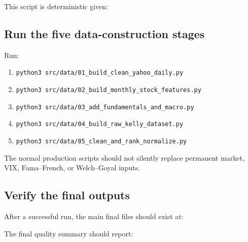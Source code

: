\documentclass[11pt,a4paper]{article}
\newcommand{\code}[1]{\texttt{#1}}
\begin{document}
This script is deterministic given:

\begin{center}
\end{center}

\subsection{Run the five data-construction stages}

Run:

\begin{enumerate}
  \item
  \code{python3 src/data/01\_build\_clean\_yahoo\_daily.py}

  \item
  \code{python3 src/data/02\_build\_monthly\_stock\_features.py}

  \item
  \code{python3 src/data/03\_add\_fundamentals\_and\_macro.py}

  \item
  \code{python3 src/data/04\_build\_raw\_kelly\_dataset.py}

  \item
  \code{python3 src/data/05\_clean\_and\_rank\_normalize.py}
\end{enumerate}

The normal production scripts should not silently replace permanent market,
VIX, Fama--French, or Welch--Goyal inputs.

\subsection{Verify the final outputs}

After a successful run, the main final files should exist at:

\begin{center}
\end{center}

\begin{center}
\end{center}

\begin{center}
\end{center}

The final quality summary should report:
\end{document}
